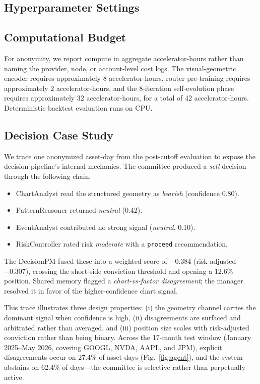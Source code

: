 \subsection{Hyperparameter Settings}



\subsection{Computational Budget}
For anonymity, we report compute in aggregate accelerator-hours rather than naming the provider, node, or account-level cost logs. The visual-geometric encoder requires approximately 8 accelerator-hours, router pre-training requires approximately 2 accelerator-hours, and the 8-iteration self-evolution phase requires approximately 32 accelerator-hours, for a total of 42 accelerator-hours. Deterministic backtest evaluation runs on CPU.

\subsection{Decision Case Study}
\label{sec:case_study}
We trace one anonymized asset-day from the post-cutoff evaluation to expose the decision pipeline's internal mechanics. The committee produced a \emph{sell} decision through the following chain:

\begin{itemize}
    \item ChartAnalyst read the structured geometry as \emph{bearish} (confidence 0.80).
    \item PatternReasoner returned \emph{neutral} (0.42).
    \item EventAnalyst contributed no strong signal (\emph{neutral}, 0.10).
    \item RiskController rated risk \emph{moderate} with a \texttt{proceed} recommendation.
\end{itemize}

\noindent The DecisionPM fused these into a weighted score of $-0.384$ (risk-adjusted $-0.307$), crossing the short-side conviction threshold and opening a 12.6\% position. Shared memory flagged a \emph{chart-vs-factor disagreement}; the manager resolved it in favor of the higher-confidence chart signal.

This trace illustrates three design properties: (i) the geometry channel carries the dominant signal when confidence is high, (ii) disagreements are surfaced and arbitrated rather than averaged, and (iii) position size scales with risk-adjusted conviction rather than being binary. Across the 17-month test window (January 2025--May 2026, covering GOOGL, NVDA, AAPL, and JPM), explicit disagreements occur on 27.4\% of asset-days (Fig.~\ref{fig:agent}), and the system abstains on 62.4\% of days---the committee is selective rather than perpetually active.


